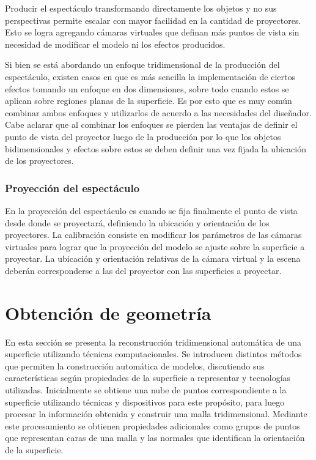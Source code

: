 Producir el espectáculo transformando directamente los objetos y no sus perspectivas permite escalar con mayor facilidad en la cantidad de proyectores. Esto se logra agregando cámaras virtuales que definan más puntos de vista sin necesidad de modificar el modelo ni los efectos producidos.

Si bien se está abordando un enfoque tridimensional de la producción del espectáculo, existen casos en que es más sencilla la implementación de ciertos efectos tomando un enfoque en dos dimensiones, sobre todo cuando estos se aplican sobre regiones planas de la superficie. Es por esto que es muy común combinar ambos enfoques y utilizarlos de acuerdo a las necesidades del diseñador. Cabe aclarar que al combinar los enfoques se pierden las ventajas de definir el punto de vista del proyector luego de la producción por lo que los objetos bidimensionales y efectos sobre estos se deben definir una vez fijada la ubicación de los proyectores.

\subsubsection{Proyección del espectáculo}

En la proyección del espectáculo es cuando se fija finalmente el punto de vista desde donde se proyectará, definiendo la ubicación y orientación de los proyectores.
La calibración consiste en modificar los parámetros de las cámaras virtuales para lograr que la proyección del modelo se ajuste sobre la superficie a proyectar.
La ubicación y orientación relativas de la cámara virtual y la escena deberán corresponderse a las del proyector con las superficies a proyectar.


\section{Obtención de geometría}

En esta sección se presenta la reconstrucción tridimensional automática de una superficie utilizando técnicas computacionales.
Se introducen distintos métodos que permiten la construcción automática de modelos, discutiendo sus características según propiedades de la superficie a representar y tecnologías utilizadas. Inicialmente se obtiene una nube de puntos correspondiente a la superficie utilizando técnicas y dispositivos para este propósito, para luego procesar la información obtenida y construir una malla tridimensional. Mediante este procesamiento se obtienen propiedades adicionales como grupos de puntos que representan caras de una malla y las normales que identifican la orientación de la superficie.


